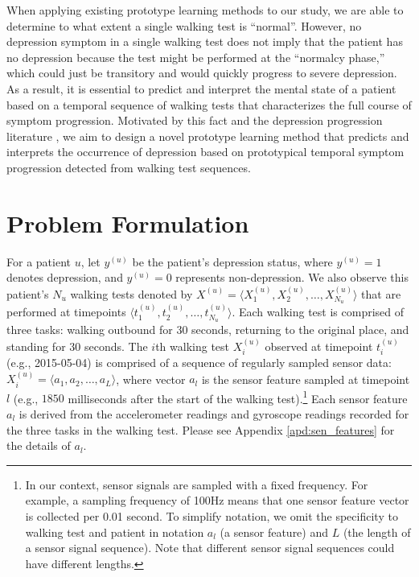 \documentclass[mnsc]{informs3b} %
\begin{document}
When applying existing prototype learning methods to our study, we are able to determine to what extent a single walking test is ``normal''. 
However, no depression symptom in a single walking test does not imply that the patient has no depression because the test might be performed at the ``normalcy phase,'' which could just be transitory and would quickly progress to severe depression. 
As a result, it is essential to predict and interpret the mental state of a patient based on a temporal sequence of walking tests that characterizes the full course of symptom progression. 
Motivated by this fact and the depression progression literature \citep{bockting_lifetime_2015,dattani_mental_2021}, we aim to design a novel prototype learning method that predicts and interprets the occurrence of depression based on prototypical temporal symptom progression detected from walking test sequences.


 


\section{Problem Formulation} \label{sec:problem_formulation}

For a patient $u$, let $y^{(u)}$ be the patient's depression status, where $y^{(u)}=1$ denotes depression, and $y^{(u)}=0$ represents non-depression. 
We also observe this patient's $N_u$ walking tests denoted by $X^{(u)}=\langle X^{(u)}_1,X^{(u)}_2,\dots,X^{(u)}_{N_u} \rangle$ that are performed at timepoints $\langle t^{(u)}_1, t^{(u)}_2, \dots, t^{(u)}_{N_u} \rangle$. Each walking test is comprised of three tasks: walking outbound for 30 seconds, returning to the original place, and standing for 30 seconds. The $i$th walking test $X_i^{(u)}$ observed at timepoint $t^{(u)}_i$ (e.g., 2015-05-04) is comprised of a sequence of regularly sampled sensor data: $X^{(u)}_i= \langle a_1, a_2,\dots,a_L \rangle $, where vector $a_l$ is the sensor feature sampled at timepoint $l$ (e.g., $1850$ milliseconds after the start of the walking test).\footnote{In our context, sensor signals are sampled with a fixed frequency. For example, a sampling frequency of 100Hz means that one sensor feature vector is collected per 0.01 second. To simplify notation, we omit the specificity to walking test and patient in notation $a_l$ (a sensor feature) and $L$ (the length of a sensor signal sequence). Note that different sensor signal sequences could have different lengths.} 
Each sensor feature $a_l$ is derived from the accelerometer readings 
and gyroscope readings 
recorded for the three tasks in the walking test. Please see Appendix \ref{apd:sen_features} for the details of $a_l$.
\end{document}
